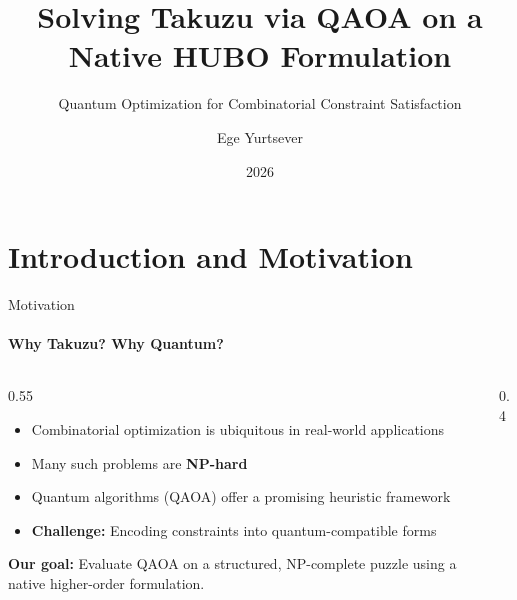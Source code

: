 \documentclass[aspectratio=169, t]{beamer}
\title{Solving Takuzu via QAOA on a Native HUBO Formulation}
\subtitle{Quantum Optimization for Combinatorial Constraint Satisfaction}
\author[E. Yurtsever]{Ege Yurtsever}
\institute{Sabancı University}
\date{2026}
\begin{document}
\titleframe

\section{Introduction and Motivation}

\begin{frame}{Motivation}
\framesubtitle{Why Takuzu? Why Quantum?}

\begin{columns}
\begin{column}{0.55\textwidth}
\begin{itemize}
    \item Combinatorial optimization is ubiquitous in real-world applications
    \item Many such problems are \textbf{NP-hard}
    \item Quantum algorithms (QAOA) offer a promising heuristic framework
    \item \textbf{Challenge:} Encoding constraints into quantum-compatible forms
\end{itemize}

\bigskip
\textbf{Our goal:} Evaluate QAOA on a structured, NP-complete puzzle using a native higher-order formulation.
\end{column}

\begin{column}{0.4\textwidth}
\centering
{}
\end{column}
\end{columns}
\end{frame}

\end{document}
